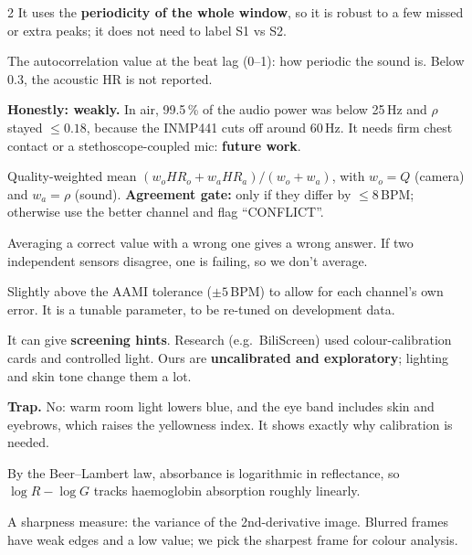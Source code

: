 \begin{multicols}{2}
{It uses the \textbf{periodicity of the whole window}, so it is robust to a few missed or extra peaks; it does not need to label
S1 vs S2.}

{The autocorrelation value at the beat lag (0--1): how periodic the sound is. Below 0.3, the acoustic HR is not reported.}

{\textbf{Honestly: weakly.} In air, 99.5\,\% of the audio power was below 25\,Hz and $\rho$ stayed $\leq 0.18$, because the
INMP441 cuts off around 60\,Hz. It needs firm chest contact or a stethoscope-coupled mic: \textbf{future work}.}



{Quality-weighted mean $(w_oHR_o+w_aHR_a)/(w_o+w_a)$, with $w_o=Q$ (camera) and $w_a=\rho$ (sound). \textbf{Agreement gate:} only if
they differ by $\leq 8$\,BPM; otherwise use the better channel and flag ``CONFLICT''.}

{Averaging a correct value with a wrong one gives a wrong answer. If two independent sensors disagree, one is failing, so we
don't average.}

{Slightly above the AAMI tolerance ($\pm5$\,BPM) to allow for each channel's own error. It is a tunable parameter, to be
re-tuned on development data.}



{It can give \textbf{screening hints}. Research (e.g.\ BiliScreen) used colour-calibration cards and controlled light. Ours are
\textbf{uncalibrated and exploratory}; lighting and skin tone change them a lot.}

{\textbf{Trap.} No: warm room light lowers blue, and the eye band includes skin and eyebrows, which raises the yellowness
index. It shows exactly why calibration is needed.}

{By the Beer--Lambert law, absorbance is logarithmic in reflectance, so $\log R - \log G$ tracks haemoglobin absorption roughly
linearly.}

{A sharpness measure: the variance of the 2nd-derivative image. Blurred frames have weak edges and a low value; we pick the
sharpest frame for colour analysis.}


\end{multicols}
